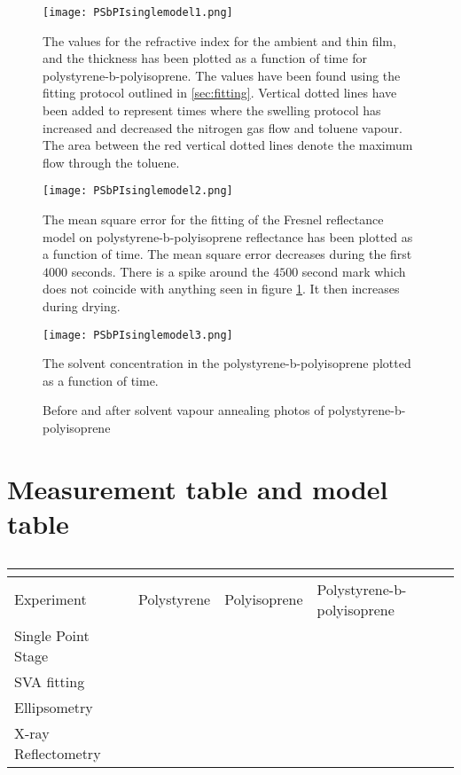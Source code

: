 \documentclass[MasterThesisMain.tex]{subfiles}
\begin{document}
\begin{figure}[H]
\centering
\texttt{[image: PSbPIsinglemodel1.png]}
\caption{The values for the refractive index for the ambient and thin film, and the thickness has been plotted as a function of time for polystyrene-b-polyisoprene. The values have been found using the fitting protocol outlined in \ref{sec:fitting}. Vertical dotted lines have been added to represent times where the swelling protocol has increased and decreased the nitrogen gas flow and toluene vapour. The area between the red vertical dotted lines denote the maximum flow through the toluene.}
\label{fig:PSbPIsinglemodel1}
\end{figure}

\begin{figure}[H]
\centering
\texttt{[image: PSbPIsinglemodel2.png]}
\caption{The mean square error for the fitting of the Fresnel reflectance model on polystyrene-b-polyisoprene reflectance has been plotted as a function of time. The mean square error decreases during the first $4000$ seconds. There is a spike around the $4500$ second mark which does not coincide with anything seen in figure \ref{fig:PSbPIsinglemodel1}. It then increases during drying.}
\label{fig:PSbPIsinglemodel2}
\end{figure}

\begin{figure}[H]
\centering
\texttt{[image: PSbPIsinglemodel3.png]}
\caption{The solvent concentration in the polystyrene-b-polyisoprene plotted as a function of time.}
\label{fig:PSbPIsinglemodel3}
\end{figure}

\begin{figure}
\centering     
{}
\caption{Before and after solvent vapour annealing photos of polystyrene-b-polyisoprene}
\end{figure}



\section{Measurement table and model table}

\begin{table}
	\caption{}
\begin{tabular}{ |p{4cm}||p{3cm}|p{3cm}|p{3cm}| }
 \hline
 \multicolumn{4}{|c|}{} \\
 \hline
 Experiment & Polystyrene & Polyisoprene & Polystyrene-b-polyisoprene\\
 \hline
 Single Point Stage & & & \\
 SVA fitting & & & \\
 Ellipsometry & & & \\  
 \hline
 X-ray Reflectometry & & & \\
 \hline
\end{tabular}
\label{}
\end{table}
\end{document}
